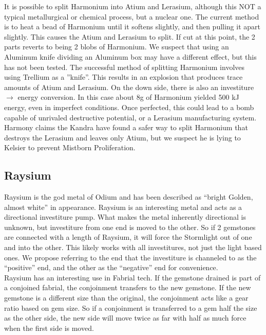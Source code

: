 \documentclass[conference]{IEEEtran}
\begin{document}
It is possible to split Harmonium into Atium and Lerasium,\cite{TLM-CH71} although this NOT a typical metallurgical or chemical process, but a nuclear one.
\cite{TLM-CH17} The current method is to heat a bead of Harmonium until it softens slightly, and then pulling it apart slightly.  This causes the Atium and Lerasium to split.  If cut at this point, the 2 parts reverts to being 2 blobs of Harmonium.\cite{TLM-CH16}  We suspect that using an Aluminum knife dividing an Aluminum box may have a different effect, but this has not been tested.  The successful method of splitting Harmonium involves using Trellium as a ''knife''.\cite{TLM-CH16}  This results in an explosion that produces trace amounts of Atium and Lerasium.\cite{TLM-CH17}\cite{TLM-CH71}  On the down side, there is also an investiture $\rightarrow$ energy conversion.  In this case about 8g of Harmonium yielded 500 kJ energy, even in imperfect conditions.  Once perfected, this could lead to a bomb capable of unrivaled destructive potential,\cite{TLM-CH71} or a Lerasium manufacturing system.  Harmony claims the Kandra have found a safer way to split Harmonium that destroys the Lerasium and leaves only Atium,\cite{TLM-3WAD} but we suspect he is lying to Kelsier to prevent Mistborn Proliferation.


\subsection*{\textbf{Raysium}\cite{rayse}}
Raysium is the god metal of Odium and has been described as ``bright Golden, almost white'' in appearance.\cite{RoW-CH84}  Raysium is an interesting metal and acts as a directional investiture pump.  What makes the metal inherently directional is unknown, but investiture from one end is moved to the other.  So if 2 gemstones are connected with a length of Raysium, it will force the Stormlight out of one and into the other.  This likely works with all investitures, not just the light based ones.\cite{RoW-CH84}  We propose referring to the end that the investiture is channeled to as the ``positive'' end, and the other as the ``negative'' end for convenience.\\

Raysium has an interesting use in Fabrial tech.  If the gemstone drained is part of a conjoined fabrial, the conjoinment transfers to the new gemstone.  If the new gemstone is a different size than the original, the conjoinment acts like a gear ratio based on gem size.  So if a conjoinment is transferred to a gem half the size as the other side, the new side will move twice as far with half as much force when the first side is moved.\cite{RoW-CH84}\\
\end{document}
